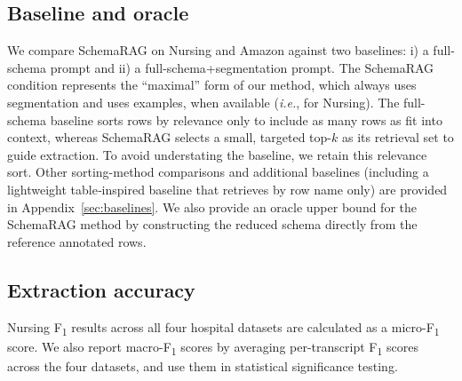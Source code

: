 \documentclass[11pt]{article}
\begin{document}
\subsection{Baseline and oracle} 
We compare SchemaRAG on Nursing and Amazon against two baselines: i) a full-schema prompt and ii) a full-schema+segmentation prompt. 
The SchemaRAG condition represents the ``maximal'' form of our method, which always uses segmentation and uses examples, when available (\textit{i.e.}, for Nursing).
The full-schema baseline sorts rows by relevance only to include as many rows as fit into context, whereas SchemaRAG selects a small, targeted top-$k$ as its retrieval set to guide extraction. To avoid understating the baseline, we retain this relevance sort. 
Other sorting-method comparisons and additional baselines (including a lightweight table‑inspired baseline that retrieves by row name only) are provided in Appendix~\ref{sec:baselines}. We also provide an oracle upper bound for the SchemaRAG method by constructing the reduced schema directly from the reference annotated rows.


\subsection{Extraction accuracy}
Nursing F\textsubscript{1} results across all four hospital datasets are calculated as a micro-F\textsubscript{1} score. We also report macro-F\textsubscript{1} scores by averaging per-transcript F\textsubscript{1} scores across the four datasets, and use them in statistical significance testing.
\end{document}
